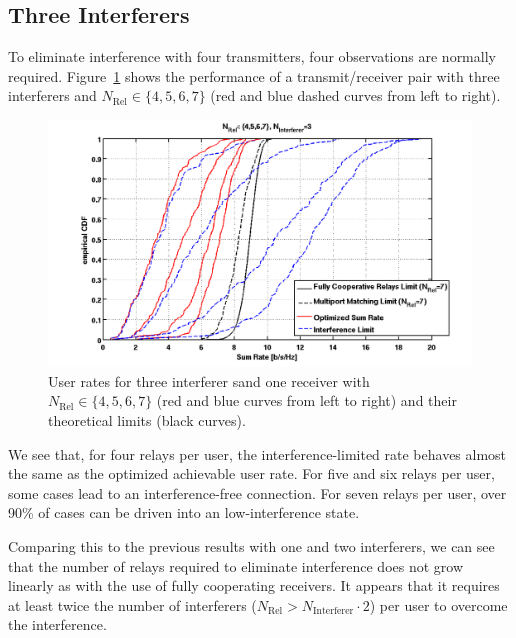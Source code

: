 \subsection{Three Interferers}
\label{sec:3interf}
To eliminate interference with four transmitters, four observations are normally required.
Figure~\ref{fig:relcomp_3} shows the performance of a transmit/receiver pair with three interferers and $N_\text{Rel}\in\{4,5,6,7\}$ (red and blue dashed curves from left to right).
\begin{figure}[h]
\centering
  \includegraphics[width=0.9\linewidth]{images/Relcomparison_3interferer.png}
\caption{User rates for three interferer sand one receiver with $N_\text{Rel}\in\{4,5,6,7\}$ (red and blue curves from left to right) and their theoretical limits (black curves).}
\label{fig:relcomp_3}
\end{figure}

We see that, for four relays per user, the interference-limited rate behaves almost the same as the optimized achievable user rate.
For five and six relays per user, some cases lead to an interference-free connection.
For seven relays per user, over 90\% of cases can be driven into an low-interference state.

Comparing this to the previous results with one and two interferers, we can see that  the number of relays required to eliminate interference does not grow linearly as with the use of fully cooperating receivers.
It appears that it requires at least twice the number of interferers ($N_\text{Rel} > N_\text{Interferer}\cdot2$) per user to overcome the interference.

